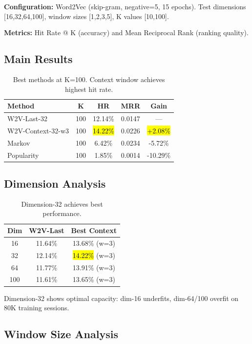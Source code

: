 \documentclass[sigconf]{acmart}
\begin{document}
\textbf{Configuration:} Word2Vec (skip-gram, negative=5, 15 epochs). Test dimensions [16,32,64,100], window sizes [1,2,3,5], K values [10,100].

\textbf{Metrics:} Hit Rate @ K (accuracy) and Mean Reciprocal Rank (ranking quality).

\subsection{Main Results}

\begin{table}[h]
\centering
\small
\begin{tabular}{lcccc}
\toprule
\textbf{Method} & \textbf{K} & \textbf{HR} & \textbf{MRR} & \textbf{Gain} \\
\midrule
W2V-Last-32 & 100 & 12.14\% & 0.0147 & — \\
W2V-Context-32-w3 & 100 & \hl{14.22\%} & 0.0226 & \hl{+2.08\%} \\
Markov & 100 & 6.42\% & 0.0234 & -5.72\% \\
Popularity & 100 & 1.85\% & 0.0014 & -10.29\% \\
\bottomrule
\end{tabular}
\caption{Best methods at K=100. Context window achieves highest hit rate.}
\label{tab:results}
\end{table}

\subsection{Dimension Analysis}

\begin{table}[h]
\centering
\small
\begin{tabular}{ccc}
\toprule
\textbf{Dim} & \textbf{W2V-Last} & \textbf{Best Context} \\
\midrule
16 & 11.64\% & 13.68\% (w=3) \\
32 & 12.14\% & \hl{14.22\%} (w=3) \\
64 & 11.77\% & 13.91\% (w=3) \\
100 & 11.61\% & 13.65\% (w=3) \\
\bottomrule
\end{tabular}
\caption{Dimension-32 achieves best performance.}
\label{tab:dimensions}
\end{table}

Dimension-32 shows optimal capacity: dim-16 underfits, dim-64/100 overfit on 80K training sessions.

\subsection{Window Size Analysis}
\end{document}
